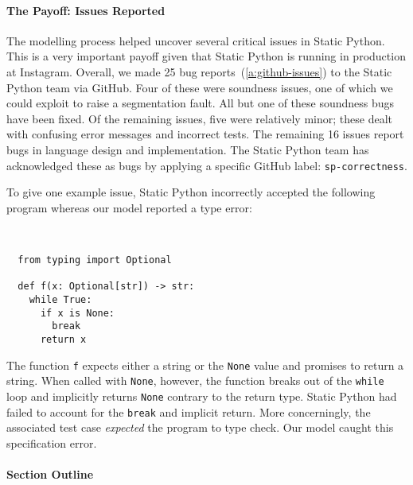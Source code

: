 \documentclass[english,cleveref,submission]{programming}
\newcommand{\SP}{Static Python}
\newcommand{\code}[1]{\texttt{#1}}
\begin{document}
\paragraph{The Payoff: Issues Reported}

The modelling process helped uncover several critical issues in \SP{}.
This is a very important payoff given that \SP{} is running in production at
Instagram.
Overall, we made 25 bug reports~(\cref{a:github-issues}) to the \SP{} team via GitHub.
Four of these were soundness issues, one of which we could exploit to raise
a segmentation fault.
All but one of these soundness bugs have been fixed.
Of the remaining issues, five were relatively minor; these dealt with confusing error messages
and incorrect tests.
The remaining 16 issues report bugs in language design and implementation.
The \SP{} team has acknowledged these as bugs by applying a specific GitHub label: \lstinline{sp-correctness}.

To give one example issue, \SP{} incorrectly accepted the following program whereas our model
reported a type error:

\medskip
\begin{minipage}[t]{0.25\columnwidth}~
\end{minipage}\begin{minipage}[t]{0.4\columnwidth}
\begin{lstlisting}
  from typing import Optional

  def f(x: Optional[str]) -> str:
    while True:
      if x is None:
        break
      return x
\end{lstlisting}
%
\end{minipage}

\noindent{}The function \code{f} expects either a string or the \code{None} value and promises to return a string.
When called with \code{None}, however, the function breaks out of the \code{while} loop
and implicitly returns \code{None} contrary to the return type.
\SP{} had failed to account for the \code{break} and implicit return.
More concerningly, the associated test case \emph{expected} the program to type check.
Our model caught this specification error.


\paragraph{Section Outline}
\end{document}
